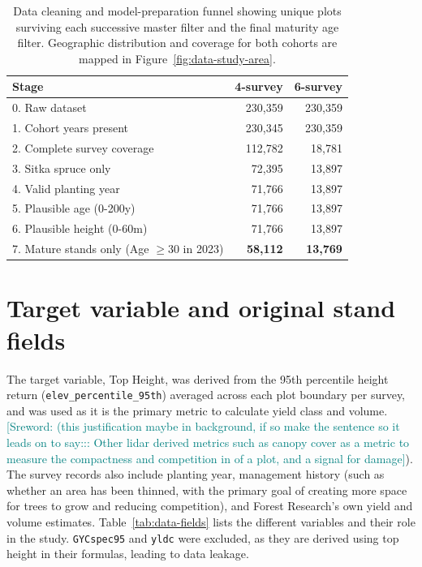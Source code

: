 \documentclass[logo,msc,ai]{infthesis}           %
\newcommand{\sr}[1]{\textcolor{teal}{[Sreword: #1]}}
\begin{document}
\begin{table}[!htbp]
\centering
\scriptsize
\begin{tabular}{lrr}
\toprule
Stage & 4-survey & 6-survey \\
\midrule
0. Raw dataset               & 230,359 & 230,359 \\
1. Cohort years present      & 230,345 & 230,359 \\
2. Complete survey coverage  & 112,782 &  18,781 \\
3. Sitka spruce only         &  72,395 &  13,897 \\
4. Valid planting year       &  71,766 &  13,897 \\
5. Plausible age (0-200y)   &  71,766 &  13,897 \\
6. Plausible height (0-60m) &  71,766 &  13,897 \\
7. Mature stands only (Age $\ge 30$ in 2023) & \textbf{58,112} & \textbf{13,769} \\
\bottomrule
\end{tabular}
\caption{Data cleaning and model-preparation funnel showing unique plots surviving each successive master filter and the final maturity age filter. Geographic distribution and coverage for both cohorts are mapped in Figure~\ref{fig:data-study-area}.}
\label{tab:data-cleaning-funnel}
\end{table}

\section{Target variable and original stand fields}
\label{sec:data-response}

The target variable, Top Height, was derived from the 95th percentile height return (\texttt{elev\_percentile\_95th}) averaged across each plot boundary per survey, and was used as it is the primary metric to calculate yield class and volume. \sr{(this justification maybe in background, if so make the sentence so it leads on to say::: Other lidar derived metrics such as canopy cover as a metric to measure the compactness and competition in of a plot, and a signal for damage}). The survey records also include planting year, management history (such as whether an area has been thinned, with the primary goal of creating more space for trees to grow and reducing competition), and Forest Research's own yield and volume estimates. Table~\ref{tab:data-fields} lists the different variables and their role in the study. \texttt{GYCspec95} and \texttt{yldc} were excluded, as they are derived using top height in their formulas, leading to data leakage.
\end{document}
